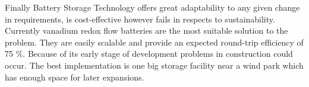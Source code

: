 \begin{parcolumns}[colwidths={1=2.5 cm, 2=10 cm, 3=2.5cm}]{3}
{\noindent
Finally Battery Storage Technology offers great adaptability to any given change in requirements, is cost-effective however fails in respects to sustainability. Currently vanadium redox flow batteries are the most suitable solution to the problem. They are easily scalable and provide an expected round-trip efficiency of 75 $\%$. Because of its early stage of development problems in construction could occur. The best implementation is one big storage facility near a wind park which has enough space for later expansions. \\ 
}

\end{parcolumns}

